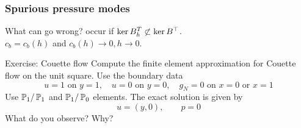 \begin{frame}
    \frametitle{Spurious pressure modes}
    \begin{block}{What can go wrong?}
         occur if
        $\operatorname{ker} B_h^T \not\subset  \operatorname{ker} B^{\top}$.
        \\
        \vspace{1em}
        $c_b = c_b(h)$ and $c_b(h) \rightarrow 0, h \rightarrow 0$.
    \end{block}
    \begin{block}{Exercise: Couette flow}
        Compute the finite element approximation for Couette
        flow on the unit square. Use the boundary data
        \begin{equation*}
            u = 1  \text{ on } y = 1, \quad
            u = 0  \text{ on } y = 0, \quad
          g_N = 0  \text{ on } x = 0 \text{ or } x = 1
        \end{equation*}
        Use $\mathbb{P}_1 /\,\mathbb{P}_1$ and $\mathbb{P}_1 /\, \mathbb{P}_0$
        elements. The exact solution is given by
        \[
            u = (y,0), \qquad p = 0
        \]
        What do you observe? Why?
    \end{block}
\end{frame}

